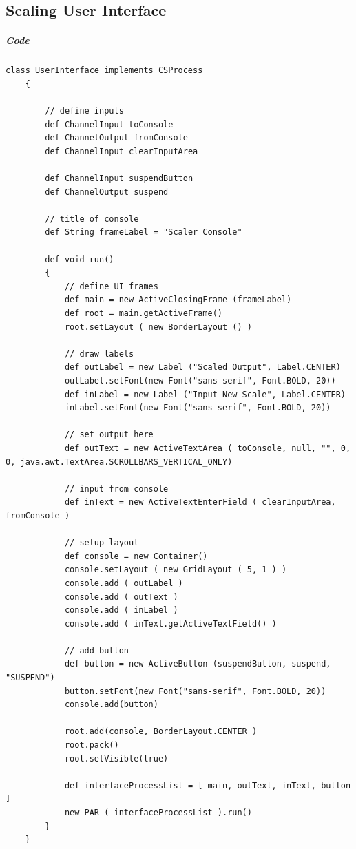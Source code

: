 \documentclass[10pt, a4paper]{article}
\begin{document}
   \setcounter{subsection}{0}

   \subsection{Scaling User Interface}
   
   \subparagraph{Code} \hfill
   \begin{lstlisting}[caption = "UserInterface.groovy"]
   	class UserInterface implements CSProcess
   	{
   	
   		// define inputs
   		def ChannelInput toConsole
   		def ChannelOutput fromConsole
   		def ChannelInput clearInputArea
   	
   		def ChannelInput suspendButton
   		def ChannelOutput suspend
   	
   		// title of console
   		def String frameLabel = "Scaler Console"
   	
   		def void run()
   		{
   			// define UI frames		
   			def main = new ActiveClosingFrame (frameLabel)
   			def root = main.getActiveFrame()
   			root.setLayout ( new BorderLayout () )
   	
   			// draw labels
   			def outLabel = new Label ("Scaled Output", Label.CENTER)
   			outLabel.setFont(new Font("sans-serif", Font.BOLD, 20))
   			def inLabel = new Label ("Input New Scale", Label.CENTER)
   			inLabel.setFont(new Font("sans-serif", Font.BOLD, 20))
   	
   			// set output here
   			def outText = new ActiveTextArea ( toConsole, null, "", 0, 0, java.awt.TextArea.SCROLLBARS_VERTICAL_ONLY)
   	
   			// input from console
   			def inText = new ActiveTextEnterField ( clearInputArea, fromConsole )
   			
   			// setup layout
   			def console = new Container()
   			console.setLayout ( new GridLayout ( 5, 1 ) )
   			console.add ( outLabel )
   			console.add ( outText )
   			console.add ( inLabel )
   			console.add ( inText.getActiveTextField() )
   	
   			// add button
   			def button = new ActiveButton (suspendButton, suspend, "SUSPEND")
   			button.setFont(new Font("sans-serif", Font.BOLD, 20))
   			console.add(button)
   	
   			root.add(console, BorderLayout.CENTER )
   			root.pack()
   			root.setVisible(true)
   			
   			def interfaceProcessList = [ main, outText, inText, button ]
   			new PAR ( interfaceProcessList ).run()
   		}
   	}   \end{lstlisting}
   
\end{document}
